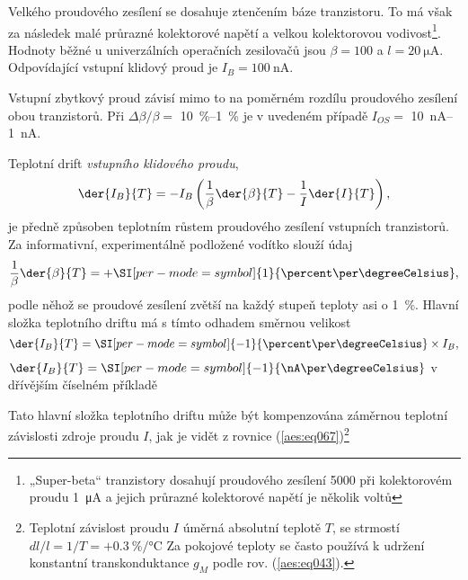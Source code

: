         Velkého proudového zesílení se dosahuje ztenčením báze tranzistoru. To má však za následek
        malé průrazné kolektorové napětí a velkou kolektorovou vodivost\footnote{ „Super-beta“
        tranzistory dosahují proudového zesílení \num{5000} při kolektorovém proudu \SI{1}{\uA} a
        jejich průrazné kolektorové napětí je několik voltů}. Hodnoty běžné u univerzálních
        operačních zesilovačů jsou \(\beta = \num{100}\) a \(l = \SI{20}{\uA}\). Odpovídající
        vstupní klidový proud je \(I_B = \SI{100}{\nA}\).

        Vstupní zbytkový proud závisí mimo to na poměrném rozdílu proudového zesílení obou
        tranzistorů. Při \(\Delta\beta/\beta =\) \SIrange{10}{1}{\percent} je v uvedeném případě
        \(I_{OS} =\) \SIrange{10}{1}{\nA}.

        Teplotní drift \emph{vstupního klidového proudu},
        \begin{equation}\label{aes:eq067}
          \der{I_B}{T} = -I_B\left(\dfrac{1}{\beta}\der{\beta}{T} - \dfrac{1}{I}\der{I}{T}\right),
        \end{equation}
        je předně způsoben teplotním růstem proudového zesílení vstupních tranzistorů. Za
        informativní, experimentálně podložené vodítko slouží údaj
        \begin{equation}\label{aes:eq068}
          \dfrac{1}{\beta}\der{\beta}{T} = +\SI[per-mode=symbol]{1}{\percent\per\degreeCelsius},
        \end{equation}
        podle něhož se proudové zesílení zvětší na každý stupeň teploty asi o \SI{1}{\percent}.
        Hlavní složka teplotního driftu má s tímto odhadem směrnou velikost
        \begin{equation}\label{aes:eq069}
          \der{I_B}{T} = \SI[per-mode=symbol]{-1}{\percent\per\degreeCelsius}\times I_B,
        \end{equation}
        \(\der{I_B}{T} =\SI[per-mode=symbol]{-1}{\nA\per\degreeCelsius}\) v dřívějším číselném
        příkladě

        Tato hlavní složka teplotního driftu může být kompenzována záměrnou teplotní závislosti
        zdroje proudu \(I\), jak je vidět z rovnice (\ref{aes:eq067})\footnote{Teplotní závislost
        proudu \(I\) úměrná absolutní teplotě \(T\), se strmostí \(dl/l = 1/T =
        +\SI[per-mode=symbol]{0.3}{\percent\per\degreeCelsius}\) Za pokojové teploty se často
        používá k udržení konstantní transkonduktance \(g_M\) podle rov. (\ref{aes:eq043}).}
        
